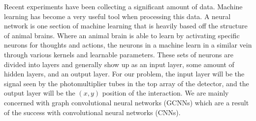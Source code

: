 Recent experiments have been collecting a significant amount of data.
Machine learning has become a very useful tool when processing this data.
A neural network is one section of machine learning that is heavily based off the structure of animal brains.
Where an animal brain is able to learn by activating specific neurons for thoughts and actions, the neurons in a machine learn in a similar vein through various kernels and learnable parameters.
These sets of neurons are divided into layers and generally show up as an input layer, some amount of hidden layers, and an output layer.
For our problem, the input layer will be the signal seen by the photomultiplier tubes in the top array of the detector, and the output layer will be the $(x,y)$ position of the interaction.
We are mainly concerned with graph convolutional neural networks (GCNNs) which are a result of the success with convolutional neural networks (CNNs).
